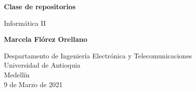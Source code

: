\documentclass{article}
\begin{document}
\begin{titlepage}
    \begin{center}
        \vspace*{1cm}
            
        \Huge
        \textbf{Clase de repositorios}
            
        \vspace{0.5cm}
        \LARGE
        Informática II
            
        \vspace{1.5cm}
            
        \textbf{Marcela Flórez Orellano }
            
        \vfill
            
        \vspace{0.8cm}
            
        \Large
        Despartamento de Ingeniería Electrónica y Telecomunicaciones\\
        Universidad de Antioquia\\
        Medellín\\
        9 de Marzo de 2021
            
    \end{center}
\end{titlepage}

\tableofcontents
\newpage
\end{document}

